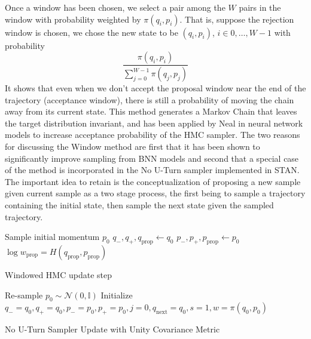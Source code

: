 \documentclass[]{report}
\begin{document}
Once a window has been chosen, we select a pair among the $W$ pairs in the window with probability weighted by $\pi(q_i,p_i)$. That is, suppose the rejection window is chosen, we chose the new state to be $(q_i,p_i)$, $i \in {0,\dots,W-1}$ with probability 
\[ \frac{\pi(q_i,p_i)}{\sum_{j=0}^{W-1} \pi(q_j,p_j)} \]
It shows that even when we don't accept the proposal window near the end of the trajectory (acceptance window), there is still a probability of moving the chain away from its current state. This method generates a Markov Chain that leaves the target distribution invariant, and has been applied by Neal in neural network models to increase acceptance probability of the HMC sampler\cite{neal1992improved}. The two reasons for discussing the Window method are first that it has been shown to
significantly improve sampling from BNN models and second that a special case of
the method is incorporated in the No U-Turn sampler implemented in STAN. The important idea to retain is the conceptualization of proposing a new sample given current sample as a two stage process, the first being to sample a trajectory containing the initial state, then sample the next state given the sampled trajectory.

\begin{algorithm}
Sample initial momentum $p_0$ \;
$q_-,q_+, q_{\text{prop}} \leftarrow q_0$\;
$p_-,p_+, p_{\text{prop}} \leftarrow p_0$ \;
$\log w_{\text{prop}} = H(q_{\text{prop}},p_{\text{prop}}) $ \;

\caption{Windowed HMC update step}
\end{algorithm}


\begin{algorithm}
    Re-sample $p_0 \sim \mathcal{N}(0,\mathbb{I})$ \;
    Initialize $q_{-} = q_0 , q_{+} = q_0 , p_{-} =p_0 , p_+ = p_0, j =0 ,	q_{\text{next}} = q_0 , s = 1 , w = \pi(q_0,p_0)$ \;

\caption{No U-Turn Sampler Update with Unity Covariance Metric}
\end{algorithm}
\end{document}
